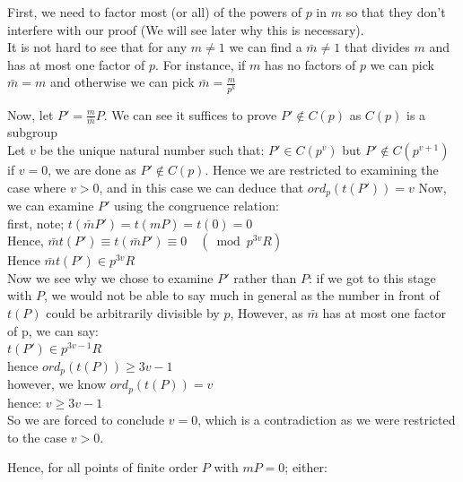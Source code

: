 \documentclass{article}
\begin{document}
First, we need to factor most (or all) of the powers of $p$ in $m$ so that they don't interfere with our proof (We will see later why this is necessary).\\

It is not hard to see that for any $m \neq 1$ we can find a $\bar{m} \neq 1$ that divides $m$ and has at most one factor of $p$. For instance, if $m$ has no factors of $p$ we can pick $\bar{m} = m$ and otherwise we can pick $\bar{m} = \frac{m}{p^k}$

Now, let $P' = \frac{m}{\bar{m}} P$. We can see it suffices to prove $P' \notin C(p)$ as $C(p)$ is a subgroup\\

Let $v$ be the unique natural number such that: $P' \in C(p^v)$ but $P' \notin C(p^{v+1})$ \\

if $v = 0$, we are done as $P' \notin C(p)$. Hence we are restricted to examining the case where $v > 0$, and in this case we can deduce that $ord_p(t(P')) = v$ Now, we can examine $P'$ using the congruence relation:\\

first, note; $t(\bar{m}P') = t(mP) = t(0) = 0$\\

Hence, $\bar{m}t(P') \equiv t(\bar{m}P') \equiv 0 \quad (\bmod{p^{3v}R})$\\

Hence $\bar{m}t(P') \in p^{3v}R$\\

Now we see why we chose to examine $P'$ rather than $P$: if we got to this stage with $P$, we would not be able to say much in general as the number in front of $t(P)$ could be arbitrarily divisible by $p$, However, as $\bar{m}$ has at most one factor of p, we can say:\\

$t(P') \in p^{3v-1}R$\\

hence $ord_p(t(P)) \geq 3v - 1$\\

however, we know $ord_p(t(P)) = v$\\

hence: $v \geq 3v - 1$\\

So we are forced to conclude $v = 0$, which is a contradiction as we were restricted to the case $v > 0$.

Hence, for all points of finite order $P$ with $mP = 0$; either:
\end{document}
